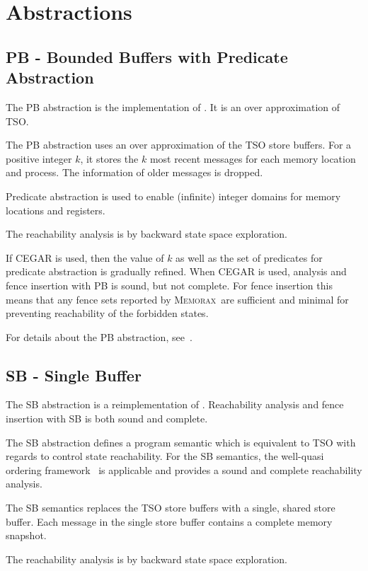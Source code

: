 \documentclass[a4paper]{article}
\newcommand{\memorax}{\textsc{Memorax}}
\begin{document}
\section{Abstractions}\label{sec:abstractions}
\subsection{PB - Bounded Buffers with Predicate Abstraction}

The PB abstraction is the implementation of \cite{AACLR12SAS}. It is
an over approximation of TSO.

The PB abstraction uses an over approximation of the TSO store
buffers. For a positive integer $k$, it stores the $k$ most recent
messages for each memory location and process. The information of
older messages is dropped.

Predicate abstraction is used to enable (infinite) integer domains for
memory locations and registers.

The reachability analysis is by backward state space exploration.

If CEGAR is used, then the value of $k$ as well as the set of
predicates for predicate abstraction is gradually refined. When CEGAR
is used, analysis and fence insertion with PB is sound, but not
complete. For fence insertion this means that any fence sets reported
by \memorax\ are sufficient and minimal for preventing reachability of
the forbidden states.

For details about the PB abstraction, see~\cite{AACLR12SAS}.

\subsection{SB - Single Buffer}

The SB abstraction is a reimplementation of
\cite{AACLR12}. Reachability analysis and fence insertion with SB is
both sound and complete.

The SB abstraction defines a program semantic which is equivalent to
TSO with regards to control state reachability. For the SB semantics,
the well-quasi ordering framework~\cite{ACJT96} is applicable and
provides a sound and complete reachability analysis.

The SB semantics replaces the TSO store buffers with a single, shared
store buffer. Each message in the single store buffer contains a
complete memory snapshot.

The reachability analysis is by backward state space exploration.
\end{document}
